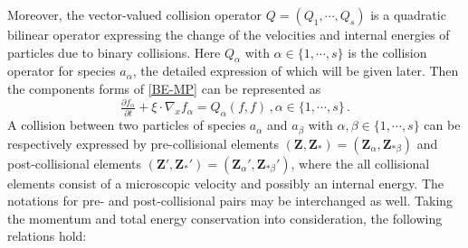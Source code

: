 \documentclass[reqno,11pt]{amsart}
\numberwithin{equation}{section}
\begin{document}
Moreover, the vector-valued collision operator $ Q = ( Q_1 , \cdots , Q_s )$ is a quadratic bilinear operator expressing the change of the velocities and internal energies of particles due to binary collisions. Here $Q_\alpha$ with $\alpha \in \{ 1, \cdots, s \}$ is the collision operator for species $a_\alpha$, the detailed expression of which will be given later. Then the components forms of \eqref{BE-MP} can be represented as
\begin{equation}\label{2.08}
	\tfrac{\partial f_\alpha}{\partial t } + \xi \cdot \nabla_x f_\alpha = Q_\alpha (f,f) \,, \alpha \in \{ 1,\cdots , s \} \,.
\end{equation}
A collision between two particles of species $a_\alpha$ and $a_\beta$ with $\alpha, \beta \in \{ 1, \cdots, s \}$ can be respectively expressed by pre-collisional elements $( \mathbf{Z}, \mathbf{Z}_* ) = ( \mathbf{Z}_\alpha, \mathbf{Z}_{* \beta} )$ and post-collisional elements $( \mathbf{Z}', \mathbf{Z}_*' ) = ( \mathbf{Z}_\alpha', \mathbf{Z}_{* \beta}' )$, where the all collisional elements consist of a microscopic velocity and possibly an internal energy. The notations for pre- and post-collisional pairs may be interchanged as well. Taking the momentum and total energy conservation into consideration, the following relations hold:
\end{document}
